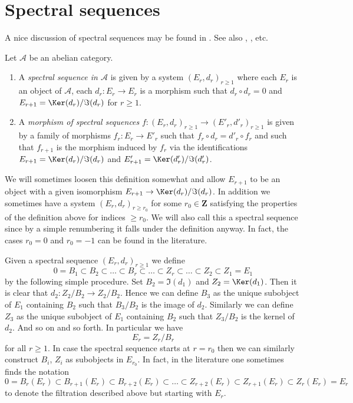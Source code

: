 \section{Spectral sequences}
\label{section-spectral-sequence}

\noindent
A nice discussion of spectral sequences may be found in
\cite{Eisenbud}. See also \cite{McCleary}, \cite{Lang}, etc.

\begin{definition}
\label{definition-spectral-sequence}
Let $\mathcal{A}$ be an abelian category.
\begin{enumerate}
\item A {\it spectral sequence in $\mathcal{A}$} is given by a
system $(E_r, d_r)_{r \geq 1}$ where each $E_r$ is an object
of $\mathcal{A}$, each $d_r : E_r \to E_r$ is a morphism such
that $d_r \circ d_r = 0$ and $E_{r + 1} = \Ker(d_r)/\Im(d_r)$
for $r \geq 1$.
\item A {\it morphism of spectral sequences}
$f : (E_r, d_r)_{r \geq 1} \to (E'_r, d'_r)_{r \geq 1}$ is
given by a family of morphisms $f_r : E_r \to E'_r$ such that
$f_r \circ d_r = d'_r \circ f_r$ and such that $f_{r + 1}$
is the morphism induced by $f_r$ via the identifications
$E_{r + 1} = \Ker(d_r)/\Im(d_r)$
and
$E'_{r + 1} = \Ker(d'_r)/\Im(d'_r)$.
\end{enumerate}
\end{definition}

\noindent
We will sometimes loosen this definition somewhat and allow $E_{r + 1}$
to be an object with a given isomorphism
$E_{r + 1} \to \Ker(d_r)/\Im(d_r)$.
In addition we sometimes have a system $(E_r, d_r)_{r \geq r_0}$
for some $r_0 \in \mathbf{Z}$ satisfying the properties of the definition above
for indices $\geq r_0$. We will also call this a spectral sequence since by
a simple renumbering it falls under the definition anyway.
In fact, the cases $r_0 = 0$ and $r_0 = -1$ can be found in the literature.

\medskip\noindent
Given a spectral sequence $(E_r, d_r)_{r \geq 1}$ we define
$$
0 = B_1 \subset B_2 \subset \ldots \subset B_r \subset \ldots
\subset Z_r \subset \ldots \subset Z_2 \subset Z_1 = E_1
$$
by the following simple procedure. Set $B_2 = \Im(d_1)$
and $Z_2 = \Ker(d_1)$. Then it is clear that
$d_2 : Z_2/B_2 \to Z_2/B_2$. Hence we can define $B_3$ as the unique
subobject of $E_1$ containing $B_2$ such that $B_3/B_2$ is the image
of $d_2$. Similarly we can define $Z_3$ as the unique subobject of
$E_1$ containing $B_2$ such that $Z_3/B_2$ is the kernel of $d_2$.
And so on and so forth. In particular we have
$$
E_r = Z_r/B_r
$$
for all $r \geq 1$. In case the spectral sequence starts at $r = r_0$
then we can similarly construct $B_i$, $Z_i$ as subobjects in $E_{r_0}$.
In fact, in the literature one sometimes finds the notation
$$
0 = B_r(E_r) \subset B_{r + 1}(E_r) \subset B_{r + 2}(E_r) \subset \ldots
\subset Z_{r + 2}(E_r) \subset Z_{r + 1}(E_r) \subset Z_r(E_r) = E_r
$$
to denote the filtration described above but starting with $E_r$.

